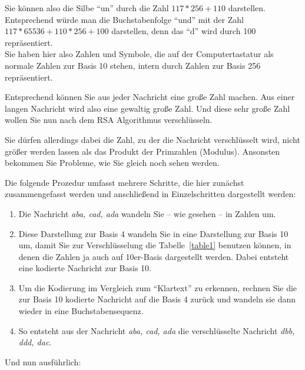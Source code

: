 \documentclass[a4paper,11pt, oneside,openright,titlepage,dvips]{scrbook}
\begin{document}
Sie können also die Silbe "`un"' durch die Zahl $117 * 256 + 110$
darstellen.\\
Entsprechend würde man die Buchstabenfolge "`und"' mit der Zahl $117 *
65536 + 110 * 256 + 100$ darstellen, denn das "`d"' wird
durch 100 repräsentiert.\\
Sie haben hier also Zahlen und Symbole, die auf der Computertastatur
als normale Zahlen zur Basis 10 stehen, intern durch Zahlen zur Basis
256 repräsentiert.

Entsprechend können Sie aus jeder Nachricht eine große Zahl machen.
Aus einer langen Nachricht wird also eine gewaltig große Zahl. Und
diese sehr große Zahl wollen Sie nun nach dem RSA Algorithmus
verschlüsseln.

Sie dürfen allerdings dabei die Zahl, zu der die Nachricht
verschlüsselt wird, nicht größer werden lassen als das Produkt der
Primzahlen (Modulus). Ansonsten bekommen Sie Probleme, wie Sie gleich
noch sehen werden.


\clearpage

Die folgende Prozedur umfasst mehrere Schritte, die hier zunächst 
zusammengefasst werden und anschließend in Einzelschritten dargestellt
werden:

\begin{enumerate}
\item Die Nachricht \emph{aba, cad, ada} wandeln Sie -- wie gesehen -- in
  Zahlen um.
\item Diese Darstellung zur Basis 4 wandeln Sie in eine Darstellung
  zur Basis 10 um, damit Sie zur Verschlüsselung die
  Tabelle~\ref{table1}
  benutzen können, in denen die Zahlen ja auch auf 10er-Basis
  dargestellt werden.  Dabei entsteht eine kodierte Nachricht zur
  Basis 10.

\item Um die Kodierung im Vergleich zum "`Klartext"' zu erkennen,
  rechnen Sie die zur Basis 10 kodierte Nachricht auf die Basis 4
  zurück und wandeln sie dann wieder in eine Buchstabensequenz.

\item So entsteht aus der Nachricht \emph{aba, cad, ada} die verschlüsselte
  Nachricht \emph{dbb, ddd, dac}.
\end{enumerate}


\clearpage

Und nun ausführlich:
\end{document}
